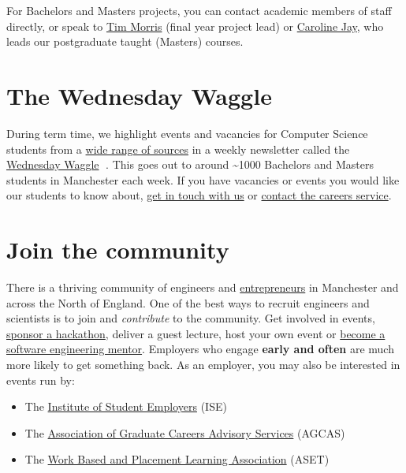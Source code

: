 \documentclass[
  12pt,
]{book}
\providecommand{\tightlist}{%
  \setlength{\itemsep}{0pt}\setlength{\parskip}{0pt}}
\begin{document}
For Bachelors and Masters projects, you can contact academic members of staff directly, or speak to \href{https://www.research.manchester.ac.uk/portal/tim.morris.html}{Tim Morris} (final year project lead) or \href{https://www.research.manchester.ac.uk/portal/caroline.jay.html}{Caroline Jay}, who leads our postgraduate taught (Masters) courses.

\hypertarget{the-wednesday-waggle}{%
\section{The Wednesday Waggle}\label{the-wednesday-waggle}}

During term time, we highlight events and vacancies for Computer Science students from a \href{http://dullhunk.github.io/where-can-I-look-for-jobs.html}{wide range of sources} in a weekly newsletter called the \href{https://waggle.cs.manchester.ac.uk/waggle/about}{Wednesday Waggle} 🐝. This goes out to around \textasciitilde1000 Bachelors and Masters students in Manchester each week. If you have vacancies or events you would like our students to know about, \protect\hyperlink{contact}{get in touch with us} or \href{http://www.careers.manchester.ac.uk/aboutus/contact/}{contact the careers service}.

\hypertarget{join-the-community}{%
\section{Join the community}\label{join-the-community}}

There is a thriving community of engineers and \href{https://www.manchesterentrepreneurs.co.uk/}{entrepreneurs} in Manchester and across the North of England. One of the best ways to recruit engineers and scientists is to join and \emph{contribute} to the community. Get involved in events, \href{https://www.unicsmcr.com/}{sponsor a hackathon}, deliver a guest lecture, host your own event or \href{https://www.cs.manchester.ac.uk/connect/business-engagement/industrial-mentoring/}{become a software engineering mentor}. Employers who engage \textbf{early and often} are much more likely to get something back. As an employer, you may also be interested in events run by:

\begin{itemize}
\tightlist
\item
  The \href{https://ise.org.uk}{Institute of Student Employers} (ISE)
\item
  The \href{https://www.agcas.org.uk}{Association of Graduate Careers Advisory Services} (AGCAS)
\item
  The \href{https://www.asetonline.org}{Work Based and Placement Learning Association} (ASET)
\end{itemize}
\end{document}
